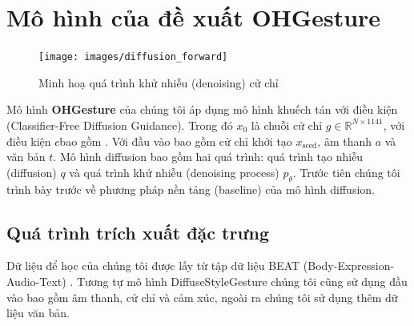 




\section{Mô hình của đề xuất OHGesture}
\label{sec:ohgesture}

\begin{figure}
	\centering
	\texttt{[image: images/diffusion\_forward]}
	\caption{Minh hoạ quá trình khử nhiễu (denoising) cử chỉ}
	\label{fig:diffusion_forward}
\end{figure}

Mô hình \textbf{OHGesture} của chúng tôi áp dụng mô hình khuếch tán \cite{ho2020denoising} với điều kiện \cite{ho2022classifier} (Classifier-Free Diffusion Guidance). Trong đó $x_0$ là chuỗi cử chỉ $g \in \mathbb{R}^{N \times 1141}$, với điều kiện $c$bao gồm  .
Với đầu vào bao gồm cử chỉ khởi tạo $x_{\text{seed}}$, âm thanh $a$ và văn bản $t$.
Mô hình diffusion bao gồm hai quá trình: quá trình tạo nhiễu (diffusion) $q$ và quá trình khử nhiễu (denoising process) $p_{\theta}$. 
Trước tiên chúng tôi trình bày trước về phương pháp nền tảng (baseline) của mô hình diffusion.

\subsection{Quá trình trích xuất đặc trưng}

Dữ liệu để học của chúng tôi được lấy từ tập dữ liệu BEAT (Body-Expression-Audio-Text)
\cite{liu2022beat}. Tương tự mô hình DiffuseStyleGesture \cite{yang2022DiffuseStyleGestureplus} chúng tôi cũng sử dụng đầu vào bao gồm âm thanh, cử chỉ và cảm xúc, ngoài ra chúng tôi sử dụng thêm dữ liệu văn bản.

